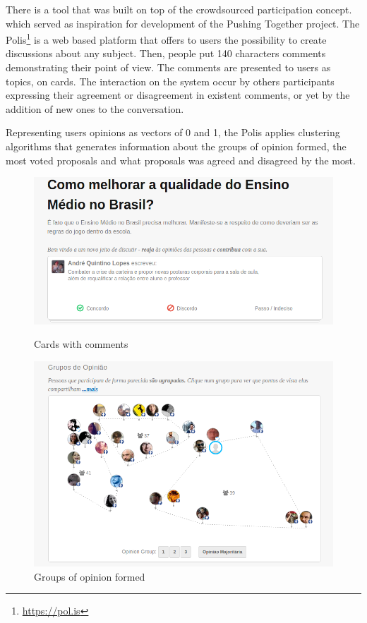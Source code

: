 \documentclass{llncs}
\begin{document}
  There is a tool that was built on top of the crowdsourced participation concept.
  which served as inspiration for development of the Pushing Together project.
  The Polis\footnote{\url{https://pol.is}} is a web based platform that offers to
  users the possibility to create discussions about any subject. Then, people put
  140 characters comments demonstrating their point of view. The comments are
  presented to users as topics, on cards. The interaction on the system occur
  by others participants expressing their agreement or disagreement
  in existent comments, or yet by the addition of new ones to the conversation.

  Representing users opinions as vectors of 0 and 1, the Polis applies clustering algorithms
  that generates information about the groups of opinion formed, the most voted
  proposals and what proposals was agreed and disagreed by the most.

 \begin{figure}[H]
   \centering
   \begin{minipage}{.50\textwidth}
     \includegraphics[width=.9\linewidth]{images/polis1.png}
     \caption{Cards with comments}
     \label{fig:polis-2}
   \end{minipage}
   \begin{minipage}{.49\textwidth}
     \includegraphics[width=.9\linewidth]{images/polis2.png}
     \caption{Groups of opinion formed}
     \label{fig:polis-1}
   \end{minipage}
 \end{figure}
\end{document}
